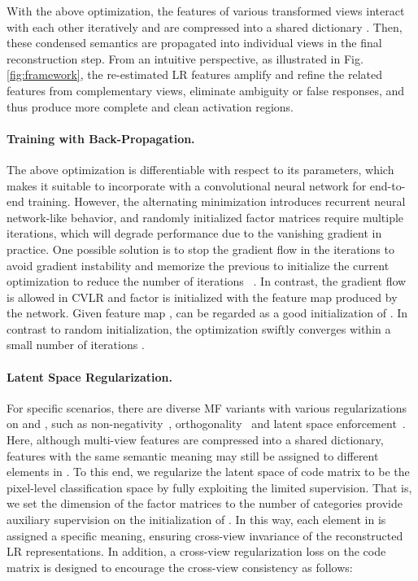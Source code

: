 \documentclass[twocolumn]{svjour3}          \smartqed  \usepackage{graphicx}
\makeatletter
\newcommand{\Fig}{Fig.\@\xspace}
\newcommand{\prelim}[1]{{#1}}
\makeatother
\begin{document}
\prelim{
With the above optimization, the features of various transformed views interact with each other iteratively and are compressed into a shared dictionary .
Then, these condensed semantics are propagated into individual views in the final reconstruction step.
From an intuitive perspective, as illustrated in \Fig\ref{fig:framework}, the re-estimated LR features amplify and refine the related features from complementary views, eliminate ambiguity or false responses, and thus produce more complete and clean activation regions.
}

\paragraph{Training with Back-Propagation.}
The above optimization is differentiable with respect to its parameters, which makes it suitable to incorporate with a convolutional neural network for end-to-end training.
However, the alternating minimization introduces recurrent neural network-like behavior, and randomly initialized factor matrices require multiple iterations, which will degrade performance due to the vanishing gradient in practice.
One possible solution is to stop the gradient flow in the iterations to avoid gradient instability and memorize the previous  to initialize the current optimization to reduce the number of iterations ~\citep{Lixia19:EMANET}.
In contrast, the gradient flow is allowed in CVLR and factor  is initialized with the feature map produced by the network.
Given feature map ,   can be regarded as a good initialization of .
In contrast to random initialization, the optimization swiftly converges within a small number of iterations .

\paragraph{Latent Space Regularization.}
For specific scenarios, there are diverse MF variants with various regularizations on  and , such as non-negativity~\citep{lee1999:NMF}, orthogonality~\citep{Ding:OrthogonalNMF} and latent space enforcement~\citep{HuTGL13:UnsupervisedSentiment}.
\prelim{
Here, although multi-view features are compressed into a shared dictionary, features with the same semantic meaning may still be assigned to different elements in . 
To this end, we regularize the latent space of code matrix  to be the pixel-level classification space by fully exploiting the limited supervision.
That is, we set the dimension  of the factor matrices to the number of categories provide auxiliary supervision on the initialization of .
In this way, each element in  is assigned a specific meaning, ensuring cross-view invariance of the reconstructed LR representations.}
In addition, a cross-view regularization loss on the code matrix  is designed to encourage the cross-view consistency as follows:
\end{document}
